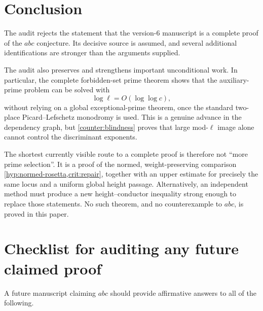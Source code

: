 \section{Conclusion}

The audit rejects the statement that the version-6 manuscript is a complete proof of the $abc$ conjecture.  Its decisive source is assumed, and several additional identifications are stronger than the arguments supplied.

The audit also preserves and strengthens important unconditional work.  In particular, the complete forbidden-set prime theorem shows that the auxiliary-prime problem can be solved with
\[
 \log\ell=O(\log\log c),
\]
without relying on a global exceptional-prime theorem, once the standard two-place Picard--Lefschetz monodromy is used.  This is a genuine advance in the dependency graph, but \cref{counter:blindness} proves that large mod-$\ell$ image alone cannot control the discriminant exponents.

The shortest currently visible route to a complete proof is therefore not ``more prime selection''.  It is a proof of the normed, weight-preserving comparison \cref{hyp:normed-rosetta,crit:repair}, together with an upper estimate for precisely the same locus and a uniform global height passage.  Alternatively, an independent method must produce a new height--conductor inequality strong enough to replace those statements.  No such theorem, and no counterexample to $abc$, is proved in this paper.

\appendix

\section{Checklist for auditing any future claimed proof}

A future manuscript claiming $abc$ should provide affirmative answers to all of the following.


